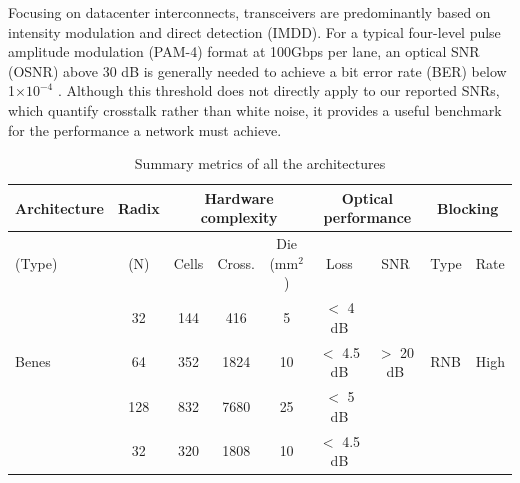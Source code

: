 Focusing on datacenter interconnects, transceivers are predominantly based on intensity modulation and direct detection (IMDD). For a typical four-level pulse amplitude modulation (PAM-4) format at 100Gbps per lane, an optical SNR (OSNR) above 30 dB is generally needed to achieve a bit error rate (BER) below 1$\times$$10^{-4}$ \cite{shiTransmissionPerformanceComparison2017,zhangTransmissionSingleLane2016}.
Although this threshold does not directly apply to our reported SNRs, which quantify crosstalk rather than white noise, it provides a useful benchmark for the performance a network must achieve.
\begin{table}[H]
    \footnotesize
    \setlength{\tabcolsep}{3pt}
    \renewcommand{\arraystretch}{1.3}
    \caption{Summary metrics of all the architectures}
    \label{tab:ch4-summary-metrics}
    \centering
    \begin{tabular}{l c ccc cc ll}
        \hline
        \textbf{Architecture} & \textbf{Radix} & \multicolumn{3}{c}{\textbf{Hardware complexity}} & \multicolumn{2}{c}{\textbf{Optical performance}} & \multicolumn{2}{c}{\textbf{Blocking}}                                        \\
        \hline \noalign{\smallskip} \hline
        (Type)                & (N)            & Cells                                            & Cross.                                           & Die (mm$^2$)                          & Loss       & SNR       & Type & Rate \\
        \hline
                              & 32             & 144                                              & 416                                              & 5                                     & $<$ 4 dB   &           &      &      \\
        Benes                 & 64             & 352                                              & 1824                                             & 10                                    & $<$ 4.5 dB & $>$ 20 dB & RNB  & High \\
                              & 128            & 832                                              & 7680                                             & 25                                    & $<$ 5 dB   &           &      &      \\
        \hline
                              & 32             & 320                                              & 1808                                             & 10                                    & $<$ 4.5 dB &           &      &      \\

\end{tabular}
\end{table}$$
